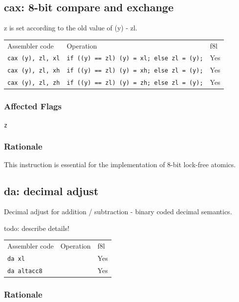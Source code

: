 \documentclass{book}
\begin{document}
\subsection{cax: 8-bit compare and exchange}

z is set according to the old value of (y) - zl.

\begin{tabular}{l l l}
Assembler code            & Operation                                        & f8l \\
\texttt{cax (y), zl, xl}  & \texttt{if ((y) == zl) (y) = xl; else zl = (y);} & Yes \\
\texttt{cax (y), zl, xh}  & \texttt{if ((y) == zl) (y) = xh; else zl = (y);} & Yes \\
\texttt{cax (y), zl, zh}  & \texttt{if ((y) == zl) (y) = zh; else zl = (y);} & Yes
\end{tabular}

\subsubsection*{Affected Flags}

\texttt{z}

\subsubsection*{Rationale}

This instruction is essential for the implementation of 8-bit lock-free atomics.


\subsection{da: decimal adjust}

Decimal adjust for addition / subtraction - binary coded decimal semantics.

todo: describe details!

\begin{tabular}{l l l}
Assembler code      & Operation & f8l \\
\texttt{da xl}      &           & Yes \\
\texttt{da altacc8} &           & Yes \\
\end{tabular}

\subsubsection*{Rationale}
\end{document}
